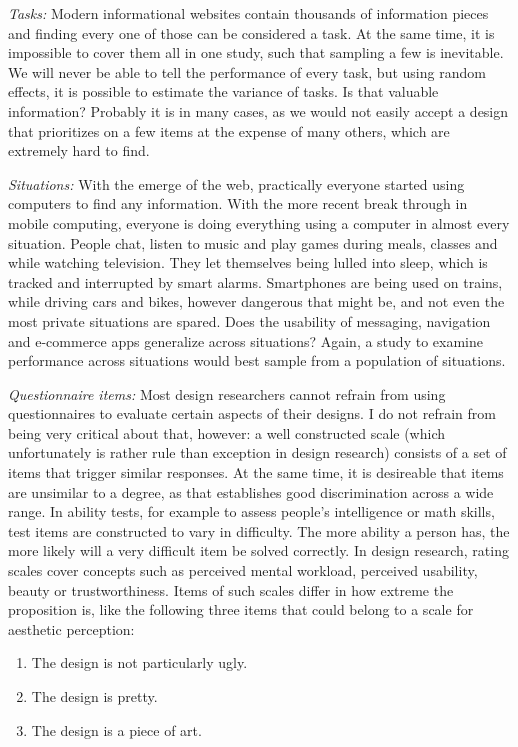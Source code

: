 \documentclass[]{svmono}
\providecommand{\tightlist}{%
  \setlength{\itemsep}{0pt}\setlength{\parskip}{0pt}}
\theoremstyle{definition}
\theoremstyle{definition}
\theoremstyle{definition}
\theoremstyle{remark}
\begin{document}
\emph{Tasks:} Modern informational websites contain thousands of
information pieces and finding every one of those can be considered a
task. At the same time, it is impossible to cover them all in one study,
such that sampling a few is inevitable. We will never be able to tell
the performance of every task, but using random effects, it is possible
to estimate the variance of tasks. Is that valuable information?
Probably it is in many cases, as we would not easily accept a design
that prioritizes on a few items at the expense of many others, which are
extremely hard to find.

\emph{Situations:} With the emerge of the web, practically everyone
started using computers to find any information. With the more recent
break through in mobile computing, everyone is doing everything using a
computer in almost every situation. People chat, listen to music and
play games during meals, classes and while watching television. They let
themselves being lulled into sleep, which is tracked and interrupted by
smart alarms. Smartphones are being used on trains, while driving cars
and bikes, however dangerous that might be, and not even the most
private situations are spared. Does the usability of messaging,
navigation and e-commerce apps generalize across situations? Again, a
study to examine performance across situations would best sample from a
population of situations.

\emph{Questionnaire items:} Most design researchers cannot refrain from
using questionnaires to evaluate certain aspects of their designs. I do
not refrain from being very critical about that, however: a well
constructed scale (which unfortunately is rather rule than exception in
design research) consists of a set of items that trigger similar
responses. At the same time, it is desireable that items are unsimilar
to a degree, as that establishes good discrimination across a wide
range. In ability tests, for example to assess people's intelligence or
math skills, test items are constructed to vary in difficulty. The more
ability a person has, the more likely will a very difficult item be
solved correctly. In design research, rating scales cover concepts such
as perceived mental workload, perceived usability, beauty or
trustworthiness. Items of such scales differ in how extreme the
proposition is, like the following three items that could belong to a
scale for aesthetic perception:

\begin{enumerate}
\def\labelenumi{\arabic{enumi}.}
\tightlist
\item
  The design is not particularly ugly.
\item
  The design is pretty.
\item
  The design is a piece of art.
\end{enumerate}
\end{document}
